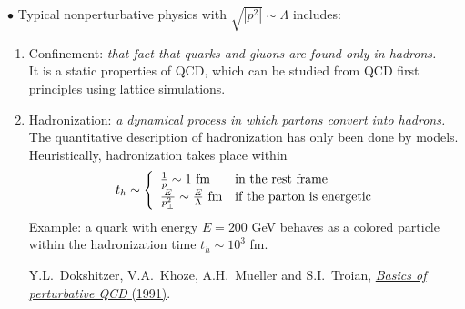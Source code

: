 \documentclass[9pt,a4paper,unknownkeysallowed,xcolor=dvipsnames,aspectratio=43]{beamer}
\begin{document}
\begin{frame}\vspace{2mm}

{\color{darkred}\Large$\bullet$} Typical nonperturbative physics with $\sqrt{|p^2|}\sim \Lambda$ includes:
\vspace{2mm}
\begin{enumerate}
    \item[\diamondsuit] {\color{darkred}Confinement:} {\it that fact that quarks and gluons are found only in hadrons.}\\\vspace{2mm}
    It is a static properties of QCD, which can be studied from QCD first principles using lattice simulations.
    \vspace{2mm}
    \item[\diamondsuit] {\color{darkred}Hadronization:} {\it a dynamical process in which partons convert into hadrons.}\\\vspace{2mm}
    The quantitative description of hadronization has only been done by models. Heuristically, hadronization takes place within
    \begin{align}
        t_h\sim \left\{
        \begin{array}{ll}
             \frac{1}{p}\sim 1~\text{fm} & \text{in the rest frame} \\
             \frac{E}{p_\perp^2}\sim \frac{E}{\Lambda}~\text{fm} & \text{if the parton is energetic}
        \end{array}
        \right.\notag
    \end{align}
    Example: a quark with energy $E = 200$ GeV behaves as a colored particle within the hadronization time $t_h\sim 10^3$ fm.\\\vspace{2mm}
    \begin{center}
        {\tiny \color{teablue}Y.L.~Dokshitzer, V.A.~Khoze, A.H.~Mueller and S.I.~Troian, \href{https://www.lpthe.jussieu.fr/~yuri/BPQCD/BPQCD.pdf}{\emph{{Basics of
  perturbative QCD}} (1991)}.
  }
    \end{center}
\end{enumerate}
\end{frame}
%
%
\end{document}

